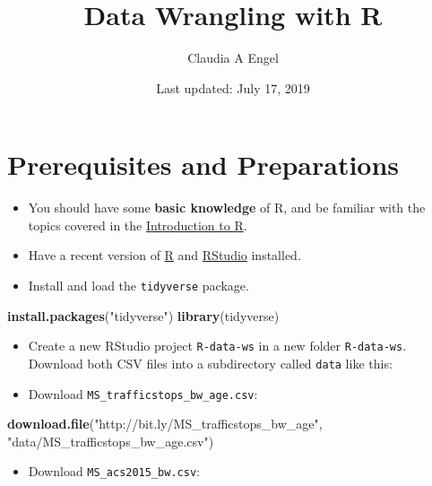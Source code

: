 \documentclass[]{book}
\title{Data Wrangling with R}
\author{Claudia A Engel}
\date{Last updated: July 17, 2019}
\newenvironment{Shaded}{\begin{snugshade}}{\end{snugshade}}
\newcommand{\KeywordTok}[1]{\textcolor[rgb]{0.13,0.29,0.53}{\textbf{#1}}}
\newcommand{\NormalTok}[1]{#1}
\newcommand{\StringTok}[1]{\textcolor[rgb]{0.31,0.60,0.02}{#1}}
\providecommand{\tightlist}{%
  \setlength{\itemsep}{0pt}\setlength{\parskip}{0pt}}
\begin{document}
\maketitle

{
\setcounter{tocdepth}{1}
\tableofcontents
}
\hypertarget{prerequisites-and-preparations}{%
\chapter*{Prerequisites and Preparations}\label{prerequisites-and-preparations}}

\begin{itemize}
\tightlist
\item
  You should have some \textbf{basic knowledge} of R, and be familiar with the topics covered in the \href{https://cengel.github.io/R-intro/}{Introduction to R}.
\item
  Have a recent version of \href{https://cran.r-project.org/}{R} and \href{https://www.rstudio.com/}{RStudio} installed.
\item
  Install and load the \texttt{tidyverse} package.
\end{itemize}

\begin{Shaded}
\begin{Highlighting}[]
\KeywordTok{install.packages}\NormalTok{(}\StringTok{"tidyverse"}\NormalTok{)  }
\KeywordTok{library}\NormalTok{(tidyverse)}
\end{Highlighting}
\end{Shaded}

\begin{itemize}
\tightlist
\item
  Create a new RStudio project \texttt{R-data-ws} in a new folder \texttt{R-data-ws}. Download both CSV files into a subdirectory called \texttt{data} like this:
\item
  Download \texttt{MS\_trafficstops\_bw\_age.csv}:
\end{itemize}

\begin{Shaded}
\begin{Highlighting}[]
\KeywordTok{download.file}\NormalTok{(}\StringTok{"http://bit.ly/MS_trafficstops_bw_age"}\NormalTok{,}
              \StringTok{"data/MS_trafficstops_bw_age.csv"}\NormalTok{)}
\end{Highlighting}
\end{Shaded}

\begin{itemize}
\tightlist
\item
  Download \texttt{MS\_acs2015\_bw.csv}:
\end{itemize}
\end{document}
